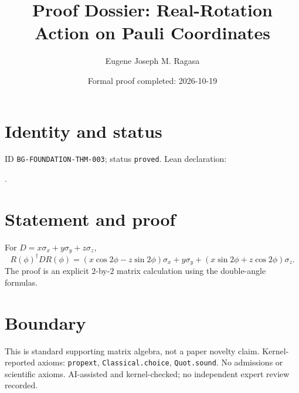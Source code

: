\documentclass[11pt]{article}
\title{Proof Dossier: Real-Rotation Action on Pauli Coordinates}\author{Eugene Joseph M. Ragasa}\date{Formal proof completed: 2026-10-19}
\begin{document}
\maketitle
\section{Identity and status}
ID \texttt{BG-FOUNDATION-THM-003}; status \texttt{proved}. Lean declaration:
\par{}.
\section{Statement and proof}
For $D=x\sigma_x+y\sigma_y+z\sigma_z$,
\[R(\phi)^\dagger D R(\phi)=
 (x\cos2\phi-z\sin2\phi)\sigma_x+y\sigma_y+
 (x\sin2\phi+z\cos2\phi)\sigma_z.\]
The proof is an explicit $2$-by-$2$ matrix calculation using the double-angle formulas.
\section{Boundary}
This is standard supporting matrix algebra, not a paper novelty claim. Kernel-reported
axioms: \texttt{propext}, \texttt{Classical.choice}, \texttt{Quot.sound}. No admissions
or scientific axioms. AI-assisted and kernel-checked; no independent expert review recorded.
\end{document}

